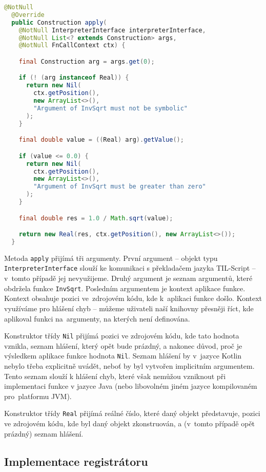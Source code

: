 \begin{lstlisting}[caption={Konstruktor InvSqrt}, language=Java]
  @NotNull
  @Override
  public Construction apply(
    @NotNull InterpreterInterface interpreterInterface,
    @NotNull List<? extends Construction> args,
    @NotNull FnCallContext ctx) {

    final Construction arg = args.get(0);

    if (! (arg instanceof Real)) {
      return new Nil(
        ctx.getPosition(),
        new ArrayList<>(),
        "Argument of InvSqrt must not be symbolic"
      );
    }

    final double value = ((Real) arg).getValue();

    if (value <= 0.0) {
      return new Nil(
        ctx.getPosition(),
        new ArrayList<>(),
        "Argument of InvSqrt must be greater than zero"
      );
    }

    final double res = 1.0 / Math.sqrt(value);

    return new Real(res, ctx.getPosition(), new ArrayList<>());
  }
\end{lstlisting}

Metoda \lstinline{apply} přijímá tři argumenty. První argument -- objekt typu
\lstinline{InterpreterInterface} slouží ke komunikaci s překladačem jazyka TIL-Script -- v~tomto
případě jej nevyužijeme. Druhý argument je seznam argumentů, které obdržela funkce
\lstinline{InvSqrt}. Posledním argumentem je kontext aplikace funkce. Kontext obsahuje pozici
ve~zdrojovém kódu, kde k~aplikaci funkce došlo. Kontext využíváme pro hlášení chyb -- můžeme
uživateli naší knihovny přesněji říct, kde aplikoval funkci na~argumenty, na kterých není
definována.

Konstruktor třídy \lstinline{Nil} přijímá pozici ve zdrojovém kódu, kde tato hodnota vznikla,
seznam hlášení, který opět bude prázdný, a nakonec důvod, proč je výsledkem aplikace funkce hodnota
\lstinline{Nil}. Seznam hlášení by v~jazyce Kotlin nebylo třeba explicitně uvádět, neboť by byl
vytvořen implicitním argumentem. Tento seznam slouží k hlášení chyb, které však nemůžou vzniknout
při implementaci funkce v jazyce Java (nebo libovolném jiném jazyce kompilovaném pro~platformu JVM).

Konstruktor třídy \lstinline{Real} přijímá reálné číslo, které daný objekt představuje, pozici
ve zdrojovém kódu, kde byl daný objekt zkonstruován, a (v~tomto případě opět prázdný) seznam
hlášení.

\subsection{Implementace registrátoru}

